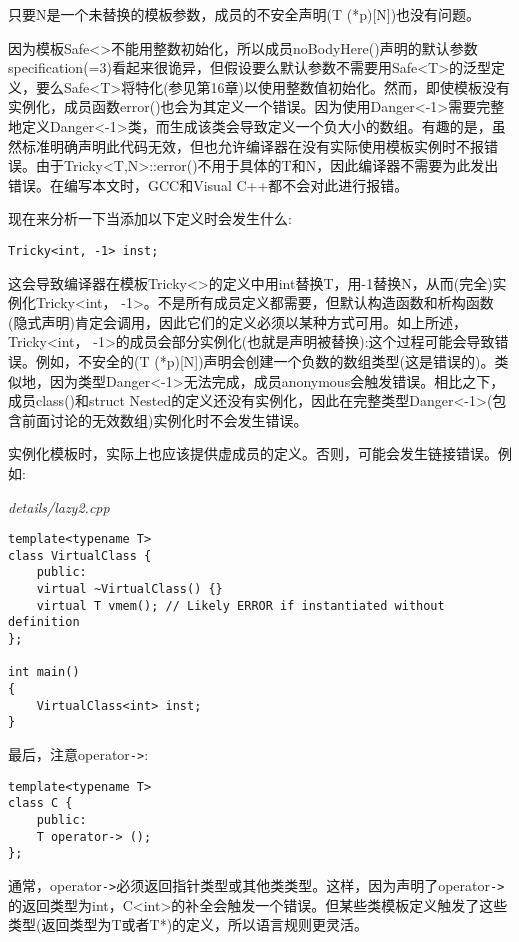 只要N是一个未替换的模板参数，成员的不安全声明(T (*p)[N])也没有问题。

因为模板Safe<>不能用整数初始化，所以成员noBodyHere()声明的默认参数specification(=3)看起来很诡异，但假设要么默认参数不需要用Safe<T>的泛型定义，要么Safe<T>将特化(参见第16章)以使用整数值初始化。然而，即使模板没有实例化，成员函数error()也会为其定义一个错误。因为使用Danger<-1>需要完整地定义Danger<-1>类，而生成该类会导致定义一个负大小的数组。有趣的是，虽然标准明确声明此代码无效，但也允许编译器在没有实际使用模板实例时不报错误。由于Tricky<T,N>::error()不用于具体的T和N，因此编译器不需要为此发出错误。在编写本文时，GCC和Visual C++都不会对此进行报错。

现在来分析一下当添加以下定义时会发生什么:

\begin{lstlisting}[style=styleCXX]
Tricky<int, -1> inst;
\end{lstlisting}

这会导致编译器在模板Tricky<>的定义中用int替换T，用-1替换N，从而(完全)实例化Tricky<int， -1>。不是所有成员定义都需要，但默认构造函数和析构函数(隐式声明)肯定会调用，因此它们的定义必须以某种方式可用。如上所述，Tricky<int， -1>的成员会部分实例化(也就是声明被替换):这个过程可能会导致错误。例如，不安全的(T (*p)[N])声明会创建一个负数的数组类型(这是错误的)。类似地，因为类型Danger<-1>无法完成，成员anonymous会触发错误。相比之下，成员class()和struct Nested的定义还没有实例化，因此在完整类型Danger<-1>(包含前面讨论的无效数组)实例化时不会发生错误。

实例化模板时，实际上也应该提供虚成员的定义。否则，可能会发生链接错误。例如:

\noindent
\textit{details/lazy2.cpp}
\begin{lstlisting}[style=styleCXX]
template<typename T>
class VirtualClass {
	public:
	virtual ~VirtualClass() {}
	virtual T vmem(); // Likely ERROR if instantiated without definition
};

int main()
{
	VirtualClass<int> inst;
}
\end{lstlisting}

最后，注意operator\texttt{->}:

\begin{lstlisting}[style=styleCXX]
template<typename T>
class C {
	public:
	T operator-> ();
};
\end{lstlisting}

通常，operator\texttt{->}必须返回指针类型或其他类类型。这样，因为声明了operator\texttt{->}的返回类型为int，C<int>的补全会触发一个错误。但某些类模板定义触发了这些类型(返回类型为T或者T*)的定义，所以语言规则更灵活。

